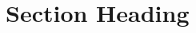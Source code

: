 \documentclass{winnower}
\begin{document}
\begin{abstract}
\end{abstract}

\pagebreak

\

\renewcommand*\contentsname{Summary}
\tableofcontents

\pagebreak

\



\section{Section Heading}
\end{document}
